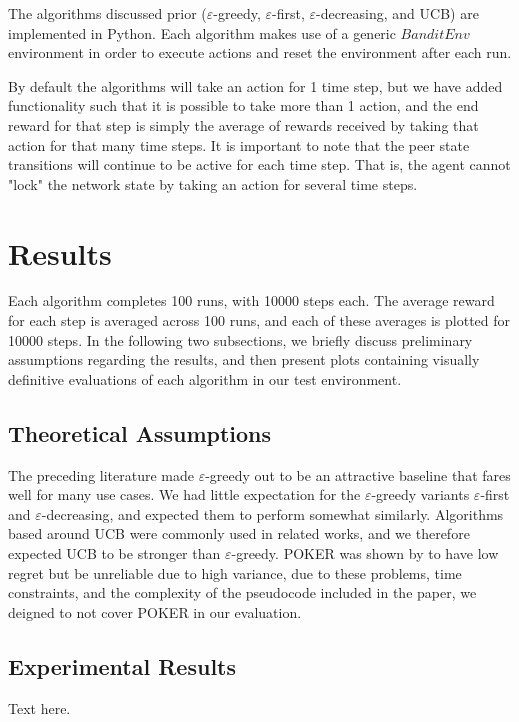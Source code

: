 \documentclass{article}
\begin{document}
The algorithms discussed prior ($\varepsilon$-greedy, $\varepsilon$-first, $\varepsilon$-decreasing, and UCB) are implemented in Python. Each algorithm makes use 
of a generic $BanditEnv$ environment in order to execute actions and reset the environment after each run. 

By default the algorithms will take an action for 1 time step, but we have added functionality such that it is possible to take more than 1 action, and the end reward 
for that step is simply the average of rewards received by taking that action for that many time steps. It is important to note that the peer state transitions will 
continue to be active for each time step. That is, the agent cannot "lock" the network state by taking an action for several time steps. 

\section{Results}
Each algorithm completes 100 runs, with 10000 steps each. The average reward for each step is averaged across 100 runs, and each of these averages is plotted for 10000 
steps. In the following two subsections, we briefly discuss preliminary assumptions regarding the results, and then present plots containing visually definitive evaluations 
of each algorithm in our test environment.

\subsection{Theoretical Assumptions} 
The preceding literature made $\varepsilon$-greedy out to be an attractive baseline that fares well for many use cases. We had little expectation for the $\varepsilon$-greedy 
variants $\varepsilon$-first and $\varepsilon$-decreasing, and expected them to perform somewhat similarly. Algorithms based around UCB were commonly used in related works, 
and we therefore expected UCB to be stronger than $\varepsilon$-greedy. POKER was shown by \cite{muMAB_wireless} to have low regret but be unreliable due to high variance, 
due to these problems, time constraints, and the complexity of the pseudocode included in the paper, we deigned to not cover POKER in our evaluation.

\subsection{Experimental Results} 
Text here.
\end{document}
